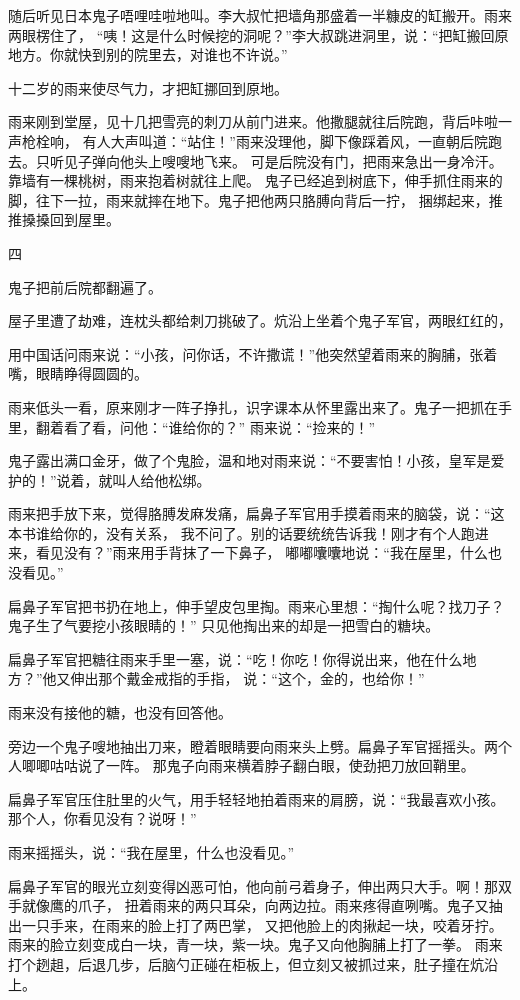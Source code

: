 \documentclass[12pt,UTF8]{ctexbook}
\begin{document}
随后听见日本鬼子唔哩哇啦地叫。李大叔忙把墙角那盛着一半糠皮的缸搬开。雨来两眼楞住了，
“咦！这是什么时候挖的洞呢？”李大叔跳进洞里，说：“把缸搬回原地方。你就快到别的院里去，对谁也不许说。”

十二岁的雨来使尽气力，才把缸挪回到原地。

雨来刚到堂屋，见十几把雪亮的刺刀从前门进来。他撒腿就往后院跑，背后咔啦一声枪栓响，
有人大声叫道：“站住！”雨来没理他，脚下像踩着风，一直朝后院跑去。只听见子弹向他头上嗖嗖地飞来。
可是后院没有门，把雨来急出一身冷汗。靠墙有一棵桃树，雨来抱着树就往上爬。
鬼子已经追到树底下，伸手抓住雨来的脚，往下一拉，雨来就摔在地下。鬼子把他两只胳膊向背后一拧，
捆绑起来，推推搡搡回到屋里。

四

鬼子把前后院都翻遍了。

屋子里遭了劫难，连枕头都给刺刀挑破了。炕沿上坐着个鬼子军官，两眼红红的，

用中国话问雨来说：“小孩，问你话，不许撒谎！”他突然望着雨来的胸脯，张着嘴，眼睛睁得圆圆的。

雨来低头一看，原来刚才一阵子挣扎，识字课本从怀里露出来了。鬼子一把抓在手里，翻着看了看，问他：“谁给你的？”
雨来说：“捡来的！”

鬼子露出满口金牙，做了个鬼脸，温和地对雨来说：“不要害怕！小孩，皇军是爱护的！”说着，就叫人给他松绑。

雨来把手放下来，觉得胳膊发麻发痛，扁鼻子军官用手摸着雨来的脑袋，说：“这本书谁给你的，没有关系，
我不问了。别的话要统统告诉我！刚才有个人跑进来，看见没有？”雨来用手背抹了一下鼻子，
嘟嘟囔囔地说：“我在屋里，什么也没看见。”

扁鼻子军官把书扔在地上，伸手望皮包里掏。雨来心里想：“掏什么呢？找刀子？鬼子生了气要挖小孩眼睛的！”
只见他掏出来的却是一把雪白的糖块。

扁鼻子军官把糖往雨来手里一塞，说：“吃！你吃！你得说出来，他在什么地方？”他又伸出那个戴金戒指的手指，
说：“这个，金的，也给你！”

雨来没有接他的糖，也没有回答他。

旁边一个鬼子嗖地抽出刀来，瞪着眼睛要向雨来头上劈。扁鼻子军官摇摇头。两个人唧唧咕咕说了一阵。
那鬼子向雨来横着脖子翻白眼，使劲把刀放回鞘里。

扁鼻子军官压住肚里的火气，用手轻轻地拍着雨来的肩膀，说：“我最喜欢小孩。那个人，你看见没有？说呀！”

雨来摇摇头，说：“我在屋里，什么也没看见。”

扁鼻子军官的眼光立刻变得凶恶可怕，他向前弓着身子，伸出两只大手。啊！那双手就像鹰的爪子，
扭着雨来的两只耳朵，向两边拉。雨来疼得直咧嘴。鬼子又抽出一只手来，在雨来的脸上打了两巴掌，
又把他脸上的肉揪起一块，咬着牙拧。雨来的脸立刻变成白一块，青一块，紫一块。鬼子又向他胸脯上打了一拳。
雨来打个趔趄，后退几步，后脑勺正碰在柜板上，但立刻又被抓过来，肚子撞在炕沿上。
\end{document}
